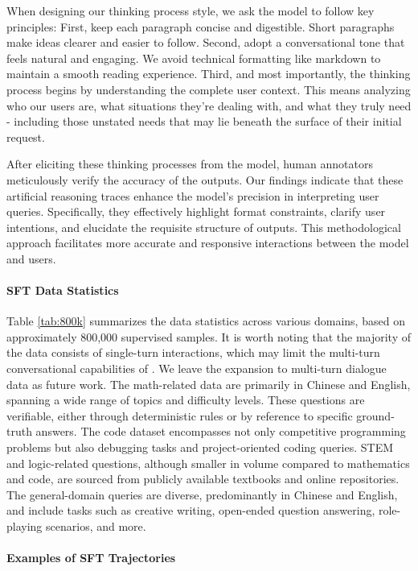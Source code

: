 When designing our thinking process style, we ask the model to follow key principles: First, keep each paragraph concise and digestible. Short paragraphs make ideas clearer and easier to follow. Second, adopt a conversational tone that feels natural and engaging. We avoid technical formatting like markdown to maintain a smooth reading experience. Third, and most importantly, the thinking process begins by understanding the complete user context. This means analyzing who our users are, what situations they're dealing with, and what they truly need - including those unstated needs that may lie beneath the surface of their initial request.

After eliciting these thinking processes from the model, human annotators meticulously verify the accuracy of the outputs. Our findings indicate that these artificial reasoning traces enhance the model's precision in interpreting user queries. Specifically, they effectively highlight format constraints, clarify user intentions, and elucidate the requisite structure of outputs. This methodological approach facilitates more accurate and responsive interactions between the model and users.



\paragraph{SFT Data Statistics}
Table \ref{tab:800k} summarizes the data statistics across various domains, based on approximately 800,000 supervised samples. It is worth noting that the majority of the data consists of single-turn interactions, which may limit the multi-turn conversational capabilities of \dsri{}. We leave the expansion to multi-turn dialogue data as future work. The math-related data are primarily in Chinese and English, spanning a wide range of topics and difficulty levels. These questions are verifiable, either through deterministic rules or by reference to specific ground-truth answers. The code dataset encompasses not only competitive programming problems but also debugging tasks and project-oriented coding queries. STEM and logic-related questions, although smaller in volume compared to mathematics and code, are sourced from publicly available textbooks and online repositories. The general-domain queries are diverse, predominantly in Chinese and English, and include tasks such as creative writing, open-ended question answering, role-playing scenarios, and more.


\paragraph{Examples of SFT Trajectories}
\label{sec:sft-example}

